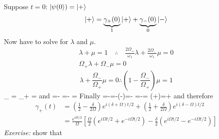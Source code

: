 \documentclass[12pt]{article}
\begin{document}
Suppose $t=0$: $\ket{\psi(0}) = \ket{+}$
\[
\ket{+}=
\underbrace{\gamma_+(0)}_{1} \ket{+}+ 
\underbrace{\gamma_-(0)}_{0} \ket{-} 
\]
Now have to solve for $\lambda$ and $\mu$.
\[
\begin{gathered}
\lambda+\mu=1 \quad \therefore \quad \frac{2 \Omega_{+}}{\omega_{1}} \lambda+\frac{2 \Omega_-}{\omega_{1}} \mu=0\\
\Omega_+\lambda+\Omega_-\mu=0
\end{gathered}
\]
\[
\lambda+\frac{\Omega_{-}}{\Omega_{+}} \mu=0 
\therefore\left(1-\frac{\Omega_{-}}{\Omega_{+}}\right) \mu=1
\]
\be
\underbrace{(\Omega_{+} + \Omega_{-})}%
_{\Omega}
\mu = \Omega_{+}
\therefore
\mu = \frac{\Omega_{+}}{\Omega}
\ee
and
\be
\lambda=-\frac{\Omega_{-}}{\Omega_{+}} \mu=-\frac{\Omega_{-}}{\Omega_{+}} \frac{\Omega_{+}}{\Omega}=
\frac{\Omega_{-}}{\Omega}
\ee
Finally
\be
\lambda=-\frac{\Omega_{-}}{\Omega}=-(\delta-\Omega)=-\frac{\delta}{2 \Omega}
\ee
\be
\lambda=-\frac{\Omega_{+}}{\Omega}= (\delta+\Omega)=+\frac{\delta}{2 \Omega}
\ee
and therefore
\[
\begin{aligned}
\gamma_{+}(t)
&=\left(\frac{1}{2}-\frac{\delta}{2 \Omega}\right) e^{i(\delta+\Omega) t / 2}+\left(\frac{1}{2}+\frac{\delta}{2 \Omega}\right) e^{i(\delta-\Omega) t / 2}\\
&=\frac{e^{i \delta t / 2}}{\Omega}\left[\frac{\Omega}{2}\left(e^{i \Omega t / 2}+e^{-i \Omega t / 2}\right)
-
\frac{\delta}{2}\left(e^{i \Omega t / 2}-e^{-i \Omega t / 2}\right)\right]
\end{aligned}
\]
\be
{}
\ee
\emph{Exercise:} show that
\be
{}
\ee
\end{document}
